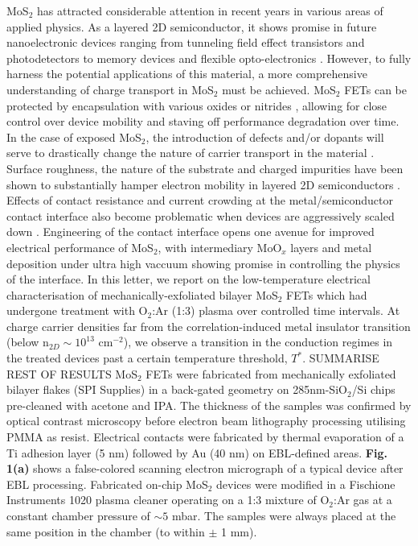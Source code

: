 \documentclass[%
 aip,
 jmp,%
 amsmath,amssymb,
 reprint,%
]{revtex4-1}
\begin{document}
MoS$_2$ has attracted considerable attention in recent years in various areas of applied physics. As a layered 2D semiconductor, it shows promise in future nanoelectronic devices ranging from tunneling field effect transistors \cite{lan2016atomic, xu2017tunneling} and photodetectors \cite{yin2011single,yoo2017enhanced} to memory devices \cite{sangwan2015gate, kshirsagar2016dynamic} and flexible opto-electronics \cite{chang2013high, lee2013flexible}. However, to fully harness the potential applications of this material, a more comprehensive understanding of charge transport in MoS$_2$ must be achieved. MoS$_2$ FETs can be protected by encapsulation with various oxides or nitrides \cite{radisavljevic2011single,lee2015highly,kim2016enhanced, qian2016improved, yuan2017pbti}, allowing for close control over device mobility and staving off performance degradation over time. In the case of exposed MoS$_2$, the introduction of defects and/or dopants will serve to drastically change the nature of carrier transport in the material \cite{yu2017analyzing}. Surface roughness, the nature of the substrate and charged impurities have been shown to substantially hamper electron mobility in layered 2D semiconductors \cite{kaasbjerg2012phonon, wang2012electronics, bao2013high}. Effects of contact resistance and current crowding at the metal/semiconductor contact interface also become problematic when devices are aggressively scaled down \cite{allain2015electrical,yuan2016field}. Engineering of the contact interface opens one avenue for improved electrical performance of MoS$_2$, with intermediary MoO$_x$ layers \cite{chuang2014mos2, mcdonnell2014hole} and metal deposition under ultra high vaccuum \cite{english2016improved} showing promise in controlling the physics of the interface. \newline 
\indent In this letter, we report on the low-temperature electrical characterisation of mechanically-exfoliated bilayer MoS$_2$ FETs which had undergone treatment with O$_2$:Ar (1:3) plasma over controlled time intervals. At charge carrier densities far from the correlation-induced metal insulator transition \cite{radisavljevic2013mobility} (below n$_{2D} \sim 10^{13}$ cm$^{-2}$), we observe a transition in the conduction regimes in the treated devices past a certain temperature threshold, $T^*$. SUMMARISE REST OF RESULTS \newline
\indent MoS$_2$ FETs were fabricated from mechanically exfoliated bilayer flakes (SPI Supplies) in a back-gated geometry on 285nm-SiO$_2$/Si chips pre-cleaned with acetone and IPA. The thickness of the samples was confirmed by optical contrast microscopy before electron beam lithography processing utilising PMMA as resist. Electrical contacts were fabricated by thermal evaporation of a Ti adhesion layer (5 nm) followed by Au (40 nm) on EBL-defined areas.  \textbf{Fig. 1(a)} shows a false-colored scanning electron micrograph of a typical device after EBL processing. Fabricated on-chip MoS$_2$ devices were modified in a Fischione Instruments 1020 plasma cleaner operating on a 1:3 mixture of O$_2$:Ar gas at a constant chamber pressure of $\sim5$ mbar. The samples were always placed at the same position in the chamber (to within $\pm$ 1 mm). 
\end{document}
